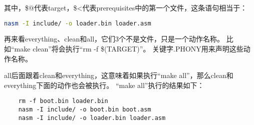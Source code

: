 \documentclass[a4paper,left=2.5cm,right=2.5cm,11pt]{article}
\begin{document}
	其中，\$@代表target，\$<代表prerequisites中的第一个文件，这条语句相当于：
	\begin{lstlisting}[language = bash]
	nasm -I include/ -o loader.bin loader.asm
	\end{lstlisting}

	再来看everything、clean和all，它们3个不是文件，只是一个动作名称。
	比如“make clean”将会执行“rm -f \$(TARGET)”。
	关键字.PHONY用来声明这些动作名称。\par

	all后面跟着clean和everything，这意味着如果执行“make all”，那么clean和everything下面的动作也会被执行。
	“make all”执行的结果如下：
	\begin{lstlisting}
	rm -f boot.bin loader.bin
	nasm -I include/ -o boot.bin boot.asm
	nasm -I include/ -o loader.bin loader.asm
	\end{lstlisting}
\end{document}
